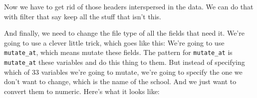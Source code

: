 \documentclass[
]{book}
\newenvironment{Shaded}{\begin{snugshade}}{\end{snugshade}}
\newcommand{\DataTypeTok}[1]{\textcolor[rgb]{0.13,0.29,0.53}{#1}}
\newcommand{\KeywordTok}[1]{\textcolor[rgb]{0.13,0.29,0.53}{\textbf{#1}}}
\newcommand{\NormalTok}[1]{#1}
\newcommand{\OperatorTok}[1]{\textcolor[rgb]{0.81,0.36,0.00}{\textbf{#1}}}
\newcommand{\StringTok}[1]{\textcolor[rgb]{0.31,0.60,0.02}{#1}}
\begin{document}
\begin{Shaded}
\end{Shaded}

Now we have to get rid of those headers interspersed in the data. We can do that with filter that say keep all the stuff that isn't this.

\begin{Shaded}
\end{Shaded}

And finally, we need to change the file type of all the fields that need it. We're going to use a clever little trick, which goes like this: We're going to use \texttt{mutate\_at}, which means mutate these fields. The pattern for \texttt{mutate\_at} is \texttt{mutate\_at} these variables and do this thing to them. But instead of specifying which of 33 variables we're going to mutate, we're going to specify the one we don't want to change, which is the name of the school. And we just want to convert them to numeric. Here's what it looks like:
\end{document}
